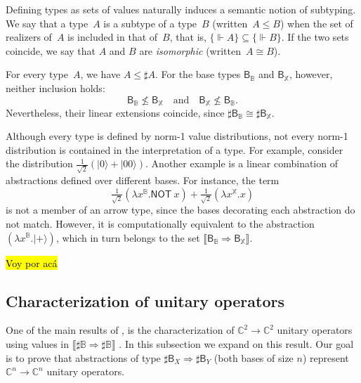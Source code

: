 \documentclass[runningheads,orivec,envcountsame,envcountsect]{llncs}
\providecommand{\qed}{\hbox{\rule{1ex}{1ex}}}%
\newcommand\ket[1]{\ensuremath{|#1\rangle}}
\def\C{\mathbb{C}}            %
\def\Sph{\mathcal{S}_1}       %
\def\Lam#1#2#3{\lambda#1^{#2}{.}#3} %
\def\Arr{\Rightarrow}
\def\sem#1{\llbracket#1\rrbracket}
\def\real{\Vdash}
\newcommand\B{\mathbb B}
\newcommand\XB{\mathbb X}
\newcommand{\pauliX}[1]{\mathsf{NOT}\ #1}
\newcommand\basis[1]{\ensuremath{\mathsf{B}_{#1}}}
\begin{document}

Defining types as sets of values naturally induces a semantic notion of
subtyping. We say that a type~$A$ is a subtype of a type~$B$
(written~$A\leq B$) when the set of realizers of~$A$ is included in that of~$B$,
that is, $\{\real A\}\subseteq\{\real B\}$.
If the two sets coincide, we say that $A$ and $B$ are \emph{isomorphic}
(written~$A\cong B$).

\begin{example}
  For every type~$A$, we have $A\leq\sharp A$.
  For the base types $\basis{\B}$ and $\basis{\XB}$, however,
  neither inclusion holds:
  \[
    \basis{\B}\not\leq\basis{\XB}
    \quad\text{and}\quad
    \basis{\XB}\not\leq\basis{\B}.
  \]
  Nevertheless, their linear extensions coincide,
  since $\sharp\basis{\B}\cong\sharp\basis{\XB}$.
\end{example}

Although every type is defined by norm-1 value distributions, not every
norm-1 distribution is contained in the interpretation of a type.
For example, consider the distribution
$\tfrac{1}{\sqrt{2}}(\ket{0} + \ket{00})$.
Another example is a linear combination of abstractions defined over different
bases. For instance, the term
\[
  \tfrac{1}{\sqrt{2}}(\Lam{x}{\B}{\pauliX{x}})
  + \tfrac{1}{\sqrt{2}}(\Lam{x}{\XB}{x})
\]
is not a member of an arrow type, since the bases decorating each abstraction
do not match. However, it is computationally equivalent to the abstraction
$(\Lam{x}{\B}{\ket{+}})$, which in turn belongs to the set
$\sem{\basis{\B}\Arr\basis{\XB}}$.


\hl{Voy por acá}

\subsection{Characterization of unitary operators}


One of the main results of \cite{DiazcaroGuillermoMiquelValironLICS19}, is the characterization of $\C^2\to\C^2$ unitary operators using values in $\sem{\sharp\B\Arr\sharp\B}$ \cite[Theorem IV.12]{DiazcaroGuillermoMiquelValironLICS19}. In this subsection we expand on this result. Our goal is to prove that abstractions of type $\sharp\basis{X}\Arr\sharp\basis{Y}$ (both bases of size $n$) represent $\C^n\to\C^n$ unitary operators.
\end{document}
